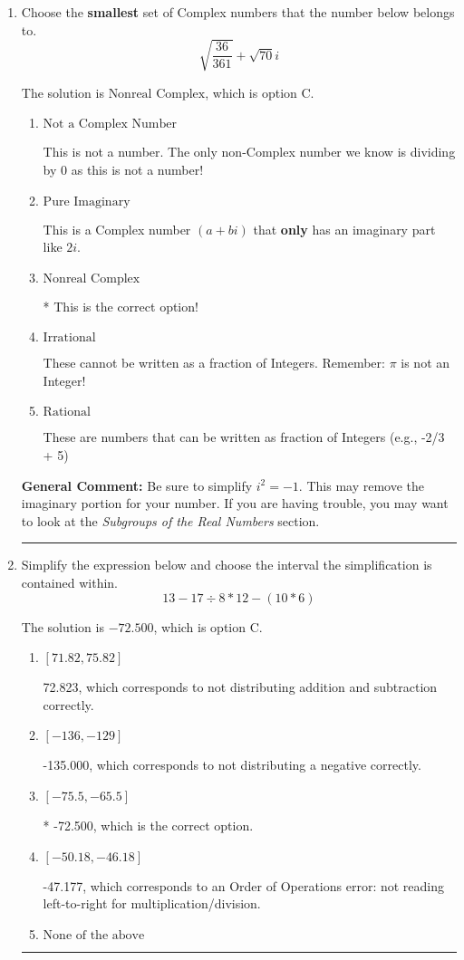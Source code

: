 \documentclass{extbook}[14pt]
\newcommand{\litem}[1]{\item #1

\rule{\textwidth}{0.4pt}}
\begin{document}
\begin{enumerate}\litem{
Choose the \textbf{smallest} set of Complex numbers that the number below belongs to.
\[ \sqrt{\frac{36}{361}}+\sqrt{70} i \]

The solution is \( \text{Nonreal Complex} \), which is option C.\begin{enumerate}[label=\Alph*.]
\item \( \text{Not a Complex Number} \)

This is not a number. The only non-Complex number we know is dividing by 0 as this is not a number!
\item \( \text{Pure Imaginary} \)

This is a Complex number $(a+bi)$ that \textbf{only} has an imaginary part like $2i$.
\item \( \text{Nonreal Complex} \)

* This is the correct option!
\item \( \text{Irrational} \)

These cannot be written as a fraction of Integers. Remember: $\pi$ is not an Integer!
\item \( \text{Rational} \)

These are numbers that can be written as fraction of Integers (e.g., -2/3 + 5)
\end{enumerate}

\textbf{General Comment:} Be sure to simplify $i^2 = -1$. This may remove the imaginary portion for your number. If you are having trouble, you may want to look at the \textit{Subgroups of the Real Numbers} section.
}
\litem{
Simplify the expression below and choose the interval the simplification is contained within.
\[ 13 - 17 \div 8 * 12 - (10 * 6) \]

The solution is \( -72.500 \), which is option C.\begin{enumerate}[label=\Alph*.]
\item \( [71.82, 75.82] \)

 72.823, which corresponds to not distributing addition and subtraction correctly.
\item \( [-136, -129] \)

 -135.000, which corresponds to not distributing a negative correctly.
\item \( [-75.5, -65.5] \)

* -72.500, which is the correct option.
\item \( [-50.18, -46.18] \)

 -47.177, which corresponds to an Order of Operations error: not reading left-to-right for multiplication/division.
\item \( \text{None of the above} \)


\end{enumerate}}
\end{enumerate}
\end{document}
